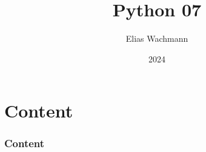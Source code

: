 \documentclass{beamer}
\title[]
{Python 07}
\author[E.~Wachmann]{\scriptsize Elias Wachmann
}
\date{2024} %
\institute[Institute of Theoretical and Computational Physics]
{
}
\begin{document}
\titleframe


\section*{Content}

\begin{frame}
\frametitle{Content}
  \tableofcontents
\end{frame}

\end{document}
